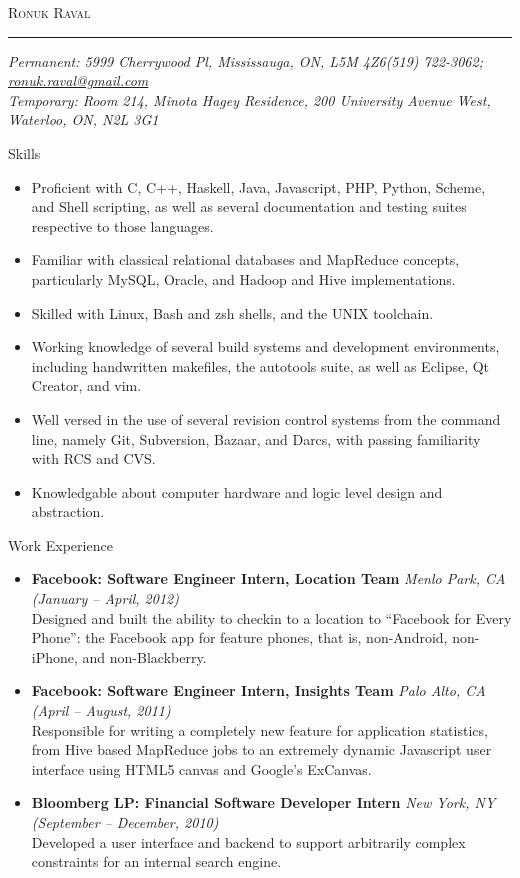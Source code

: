 \documentclass[11pt,oneside]{article}
\makeatletter
\newcommand{\name}{Ronuk Raval}
\newcommand{\permaddr}{5999 Cherrywood Pl, Mississauga, ON, L5M 4Z6}
\newcommand{\tempaddr}{
    Room 214,
    Minota Hagey Residence,
    200 University Avenue West,
    Waterloo, ON, N2L 3G1
}
\newcommand{\phone}{(519) 722-3062}
\newcommand{\email}{ronuk.raval@gmail.com}
\newcommand{\website}{http://zeroindexed.com}
\newcommand{\bigname}[1]{
    \begin{center}\fontfamily{phv}\selectfont\Huge\scshape#1\end{center}
}
\newcommand{\respara}[1]{
    \vspace{4pt}
    {\fontfamily{phv} \selectfont \Large #1} \\
    \vspace{4pt}
    \hspace{19pt}
}
\newenvironment{ressection}[1]{
    \respara{#1}
    \begin{itemize}
    \vspace{-20pt}
}{
    \end{itemize}
}
\newcommand{\resitem}[1]{
    \vspace{-4pt}
    \item \begin{flushleft} #1 \end{flushleft}
}
\newcommand{\resbigitem}[3]{
    \item
    \textbf{#1} \hfill \textit{#2} \\
    #3
}
\makeatother
\begin{document}
 \selectfont

\bigname{\name}

\vspace{-8pt} \rule{\textwidth}{1pt}

\vspace{-1pt} {\small\itshape Permanent: \permaddr \hfill \phone; \href{mailto:\email}{\email}\\
    Temporary: \tempaddr}%

\vspace{8 pt}



\begin{ressection}{Skills}

    \resitem{Proficient with C, C++, Haskell, Java, Javascript, PHP, Python,
        Scheme, and Shell scripting, as well as several documentation and
        testing suites respective to those languages.}

    \resitem{Familiar with classical relational databases and MapReduce
        concepts, particularly MySQL, Oracle, and Hadoop and Hive
        implementations.}

    \resitem{Skilled with Linux, Bash and zsh shells, and the UNIX toolchain.}

    \resitem{Working knowledge of several build systems and development environments,
        including handwritten makefiles, the autotools suite, as well as Eclipse,
        Qt Creator, and vim.}

    \resitem{Well versed in the use of several revision control systems from the command
        line, namely Git, Subversion, Bazaar, and Darcs, with passing familiarity with
        RCS and CVS.}

    \resitem{Knowledgable about computer hardware and logic level design and abstraction.}

\end{ressection}

\begin{ressection}{Work Experience}

    \resbigitem{Facebook: Software Engineer Intern, Location Team}
        {Menlo Park, CA (January -- April, 2012)}
        {Designed and built the ability to checkin to a location to ``Facebook
        for Every Phone'': the Facebook app for feature phones, that is,
        non-Android, non-iPhone, and non-Blackberry.}

    \resbigitem{Facebook: Software Engineer Intern, Insights Team}
        {Palo Alto, CA (April -- August, 2011)}
        {Responsible for writing a completely new feature for application
        statistics, from Hive based MapReduce jobs to an extremely dynamic
        Javascript user interface using HTML5 canvas and Google's ExCanvas.}

    \resbigitem{Bloomberg LP: Financial Software Developer Intern}
        {New York, NY (September -- December, 2010)}
        {Developed a user interface and backend to support arbitrarily complex
        constraints for an internal search engine.}

\end{ressection}
\end{document}
